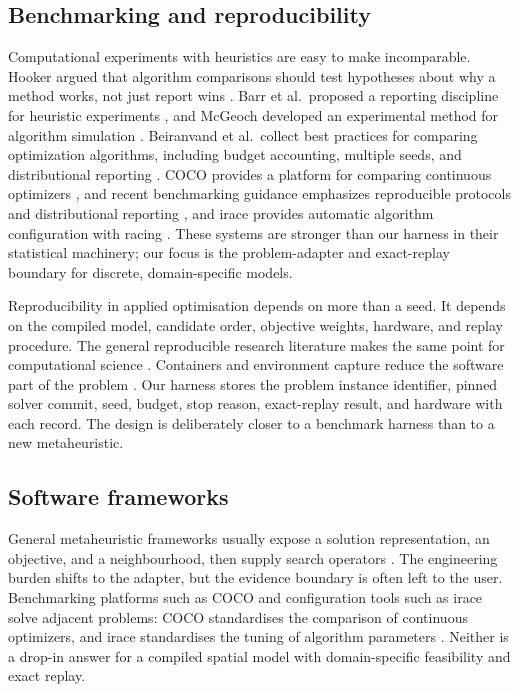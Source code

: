 \documentclass[11pt]{article}
\begin{document}
\subsection{Benchmarking and reproducibility}

Computational experiments with heuristics are easy to make incomparable. Hooker argued that
algorithm comparisons should test hypotheses about why a method works, not just report wins
\citep{hooker1995}. Barr et al.\ proposed a reporting discipline for heuristic experiments
\citep{barr1995}, and McGeoch developed an experimental method for algorithm simulation
\citep{mcgeoch1996}. Beiranvand et al.\ collect best practices for comparing optimization algorithms,
including budget accounting, multiple seeds, and distributional reporting \citep{beiranvand2017}.
COCO provides a platform for comparing continuous optimizers \citep{hansen2020}, and recent benchmarking guidance emphasizes reproducible protocols and distributional reporting \citep{bartz2020}, and irace provides
automatic algorithm configuration with racing \citep{lopez2016}. These systems are stronger than our
harness in their statistical machinery; our focus is the problem-adapter and exact-replay boundary for
discrete, domain-specific models.

Reproducibility in applied optimisation depends on more than a seed. It depends on the compiled
model, candidate order, objective weights, hardware, and replay procedure. The general reproducible
research literature makes the same point for computational science
\citep{peng2011,sandve2013,wilson2014,stodden2016,donoho2009}. Containers and environment capture
reduce the software part of the problem \citep{boettiger2015,kurtzer2017}. Our harness stores the
problem instance identifier, pinned solver commit, seed, budget, stop reason, exact-replay result,
and hardware with each record. The design is deliberately closer to a benchmark harness than to a new
metaheuristic.

\subsection{Software frameworks}

General metaheuristic frameworks usually expose a solution representation, an objective, and a
neighbourhood, then supply search operators \citep{blum2003,hoos2004}. The engineering burden shifts
to the adapter, but the evidence boundary is often left to the user. Benchmarking platforms such as
COCO and configuration tools such as irace solve adjacent problems: COCO standardises the comparison
of continuous optimizers, and irace standardises the tuning of algorithm parameters
\citep{hansen2020,lopez2016}. Neither is a drop-in answer for a compiled spatial model with
domain-specific feasibility and exact replay.
\end{document}
